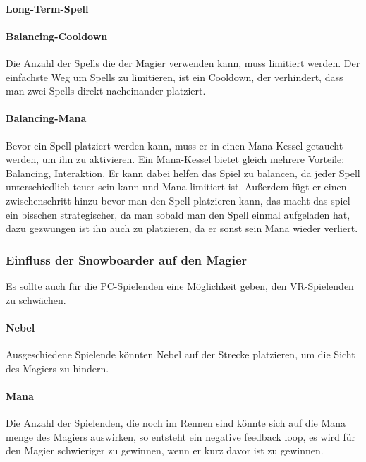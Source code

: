 \paragraph{Long-Term-Spell}

\paragraph{Balancing-Cooldown}
Die Anzahl der Spells die der Magier verwenden kann, muss limitiert werden. Der einfachste Weg um Spells zu limitieren, ist ein Cooldown, der verhindert, dass man zwei Spells direkt nacheinander platziert.

\paragraph{Balancing-Mana}
Bevor ein Spell platziert werden kann, muss er in einen Mana-Kessel getaucht werden, um ihn zu aktivieren. Ein Mana-Kessel bietet gleich mehrere Vorteile: Balancing, Interaktion. Er kann dabei helfen das Spiel zu balancen, da jeder Spell unterschiedlich teuer sein kann und Mana limitiert ist. Außerdem fügt er einen zwischenschritt hinzu bevor man den Spell platzieren kann, das macht das spiel ein bisschen strategischer, da man sobald man den Spell einmal aufgeladen hat, dazu gezwungen ist ihn auch zu platzieren, da er sonst sein Mana wieder verliert.

\subsubsection{Einfluss der Snowboarder auf den Magier}

Es sollte auch für die PC-Spielenden eine Möglichkeit geben, den VR-Spielenden zu schwächen.

\paragraph{Nebel}
Ausgeschiedene Spielende könnten Nebel auf der Strecke platzieren, um die Sicht des Magiers zu hindern.

\paragraph{Mana}
Die Anzahl der Spielenden, die noch im Rennen sind könnte sich auf die Mana menge des Magiers auswirken, so entsteht ein negative feedback loop, es wird für den Magier schwieriger zu gewinnen, wenn er kurz davor ist zu gewinnen.

